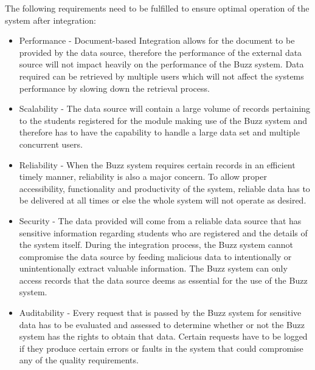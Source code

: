 The following requirements need to be fulfilled to ensure optimal operation of the system after integration:
\begin{itemize}

\item Performance - Document-based Integration allows for the document to be provided by the data source, therefore the performance of the external data source will not impact heavily on the performance of the Buzz system. Data required can be retrieved by multiple users which will not affect the systems performance by slowing down the retrieval process. 
\item Scalability - The data source will contain a large volume of records pertaining to the students registered for the module making use of the Buzz system and therefore has to have the capability to handle a large data set and multiple concurrent users.
\item Reliability - When the Buzz system requires certain records in an efficient timely manner, reliability is also a major concern. To allow proper accessibility, functionality and productivity of the system, reliable data has to be delivered at all times or else the whole system will not operate as desired.
\item Security - The data provided will come from a reliable data source that has sensitive information regarding students who are registered and the details of the system itself. During the integration process, the Buzz system cannot compromise the data source by feeding malicious data to intentionally or unintentionally extract valuable information. The Buzz system can only access records that the data source deems as essential for the use of the Buzz system.
\item Auditability - Every request that is passed by the Buzz system for sensitive data has to be evaluated and assessed to determine whether or not the Buzz system has the rights to obtain that data. Certain requests have to be logged if they produce certain errors or faults in the system that could compromise any of the quality requirements.
\end{itemize}